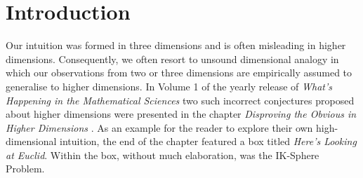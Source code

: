 \section{Introduction}
Our intuition was formed in three dimensions and is often misleading in higher dimensions. Consequently, we often resort to unsound dimensional analogy in which our observations from two or three dimensions are empirically assumed to generalise to higher dimensions. In Volume 1 of the yearly release of \textit{What’s Happening in the Mathematical Sciences} two such incorrect conjectures proposed about higher dimensions were presented in the chapter \textit{Disproving the Obvious in Higher Dimensions} \cite{Cipra_1993}. As an example for the reader to explore their own high-dimensional intuition, the end of the chapter featured a box titled \textit{Here's Looking at Euclid}. Within the box, without much elaboration, was the IK-Sphere Problem.

